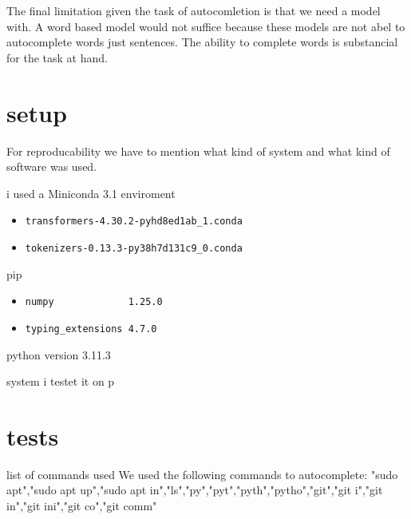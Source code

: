 The final limitation given the task of autocomletion is that we need a model with. A word based model would not suffice because these models are not abel to autocomplete words just sentences. The ability to complete words is substancial for the task at hand.

\pagebreak



\section{setup}\raggedbottom

For reproducability we have to mention what kind of system and what kind of software
was used.





i used a Miniconda 3.1 enviroment

\begin{itemize}
\item \begin{verbatim}
transformers-4.30.2-pyhd8ed1ab_1.conda
\end{verbatim}

\item \begin{verbatim}
tokenizers-0.13.3-py38h7d131c9_0.conda
\end{verbatim}
  
\end{itemize}

pip
\begin{itemize}
\item \begin{verbatim}
numpy             1.25.0
\end{verbatim}

\item \begin{verbatim}
typing_extensions 4.7.0
\end{verbatim}
  
\end{itemize}


python version  3.11.3

system i testet it on 
p


\section{tests}
list of commands used
We used the following commands to autocomplete:
"sudo apt","sudo apt up","sudo apt in","ls","py","pyt","pyth","pytho","git","git i","git in","git ini","git co","git comm"

